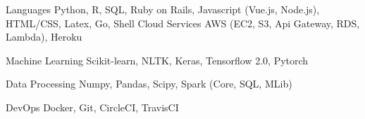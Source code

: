 

\begin{cvskills}


  \cvskill
  {Languages}
  {
    Python, R, SQL, Ruby on Rails, Javascript (Vue.js, Node.js), HTML/CSS, Latex, Go, Shell
  }
  \cvskill
  {Cloud Services}
  {AWS (EC2, S3, Api Gateway, RDS, Lambda), Heroku}

  \cvskill
  {Machine Learning} %
  {Scikit-learn, NLTK, Keras, Tensorflow 2.0, Pytorch}

  \cvskill
  {Data Processing}
  {Numpy, Pandas, Scipy, Spark (Core, SQL, MLib)}

  \cvskill
  {DevOps}
  {Docker, Git, CircleCI, TravisCI}

\end{cvskills}
